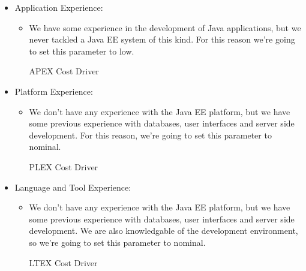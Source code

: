 \begin{itemize}
	\item Application Experience: 
	\begin{itemize}
	\item[] We have some experience in the development of Java applications, but we never tackled a Java EE system of this kind. For this reason we're going to set this parameter to low. 
	\begin{costdriverstable}{APEX Cost Driver}
		\hline
	\end{costdriverstable}
	\end{itemize}
\end{itemize}

\begin{itemize}
	\item Platform Experience: 
	\begin{itemize}
	\item[] We don't have any experience with the Java EE platform, but we have some previous experience with databases, user interfaces and server side development. For this reason, we're going to set this parameter to nominal.
	\begin{costdriverstable}{PLEX Cost Driver}
		\hline
	\end{costdriverstable}
	\end{itemize}
\end{itemize}

\begin{itemize}
	\item Language and Tool Experience: 
	\begin{itemize}
	\item[] We don't have any experience with the Java EE platform, but we have some previous experience with databases, user interfaces and server side development. We are also knowledgable of the development environment, so we're going to set this parameter to nominal.
	\begin{costdriverstable}{LTEX Cost Driver}
		\hline
	\end{costdriverstable}
	\end{itemize}
\end{itemize}

